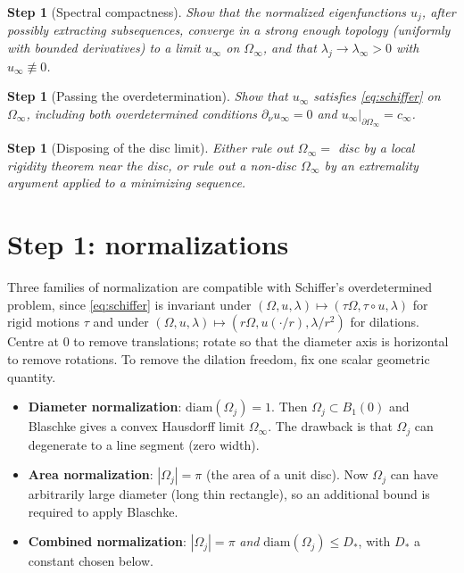 \documentclass[11pt]{article}
\newcommand{\Om}{\Omega}
\newcommand{\1}{\mathbf 1}
\newcommand{\nor}{\partial_\nu}
\newcommand{\diam}{\mathrm{diam}}
\newtheorem{step}[lem]{Step}
\begin{document}
\begin{step}[Spectral compactness]\label{step:spectral}
Show that the normalized eigenfunctions $u_j$, after possibly
extracting subsequences, converge in a strong enough topology
(uniformly with bounded derivatives) to a limit $u_\infty$ on
$\Om_\infty$, and that $\lambda_j\to\lambda_\infty>0$ with
$u_\infty\not\equiv 0$.
\end{step}

\begin{step}[Passing the overdetermination]\label{step:pass}
Show that $u_\infty$ satisfies \eqref{eq:schiffer} on $\Om_\infty$,
including both overdetermined conditions
$\nor u_\infty=0$ and $u_\infty|_{\partial\Om_\infty}=c_\infty$.
\end{step}

\begin{step}[Disposing of the disc limit]\label{step:disc}
Either rule out $\Om_\infty=$ disc by a local rigidity theorem near
the disc, or rule out a non-disc $\Om_\infty$ by an extremality
argument applied to a minimizing sequence.
\end{step}

\section{Step 1: normalizations}

Three families of normalization are compatible with Schiffer's
overdetermined problem, since \eqref{eq:schiffer} is invariant under
$(\Om,u,\lambda)\mapsto(\tau\Om,\tau\circ u,\lambda)$ for rigid motions
$\tau$ and under $(\Om,u,\lambda)\mapsto(r\Om,u(\cdot/r),\lambda/r^2)$
for dilations. Centre at $0$ to remove translations; rotate so that
the diameter axis is horizontal to remove rotations. To remove the
dilation freedom, fix one scalar geometric quantity.

\begin{itemize}[leftmargin=*]
    \item \textbf{Diameter normalization}: $\diam(\Om_j)=1$. Then
    $\Om_j\subset B_1(0)$ and Blaschke gives a convex Hausdorff limit
    $\Om_\infty$. The drawback is that $\Om_j$ can degenerate to a
    line segment (zero width).
    \item \textbf{Area normalization}: $|\Om_j|=\pi$ (the area of
    a unit disc). Now $\Om_j$ can have arbitrarily large diameter
    (long thin rectangle), so an additional bound is required to
    apply Blaschke.
    \item \textbf{Combined normalization}: $|\Om_j|=\pi$ \emph{and}
    $\diam(\Om_j)\le D_*$, with $D_*$ a constant chosen below.
\end{itemize}
\end{document}
